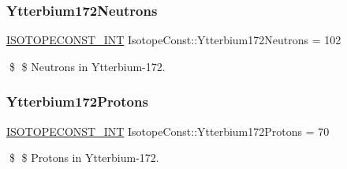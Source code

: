\subsubsection{\texorpdfstring{Ytterbium172\+Neutrons}{Ytterbium172Neutrons}}
{\footnotesize\ttfamily \mbox{\hyperlink{group___isotope_const-_macros_ga5f18360b3e99483a35c32d789e62621c}{I\+S\+O\+T\+O\+P\+E\+C\+O\+N\+S\+T\+\_\+\+I\+NT}} Isotope\+Const\+::\+Ytterbium172\+Neutrons = 102}

\$ \$ Neutrons in Ytterbium-\/172. \mbox{\label{group___isotope_const-_ytterbium-_yb172_ga0fc1c300f0d9677ab2b4d7c1a2bee3bc}} 
\subsubsection{\texorpdfstring{Ytterbium172\+Protons}{Ytterbium172Protons}}
{\footnotesize\ttfamily \mbox{\hyperlink{group___isotope_const-_macros_ga5f18360b3e99483a35c32d789e62621c}{I\+S\+O\+T\+O\+P\+E\+C\+O\+N\+S\+T\+\_\+\+I\+NT}} Isotope\+Const\+::\+Ytterbium172\+Protons = 70}

\$ \$ Protons in Ytterbium-\/172. 